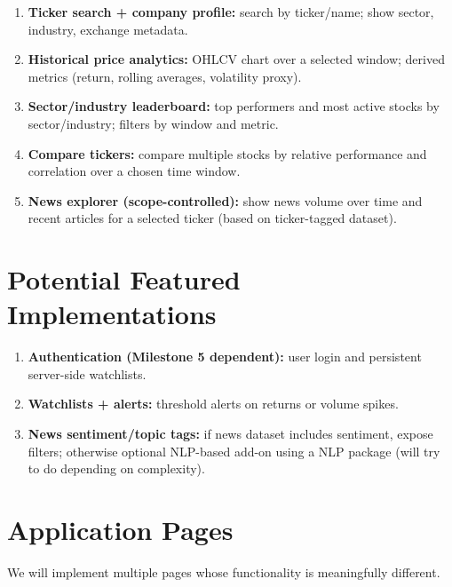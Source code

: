 \documentclass[11pt]{article}
\begin{document}
\begin{enumerate}[label=\textbf{\arabic*.}]
    \item \textbf{Ticker search + company profile:} search by ticker/name; show sector, industry, exchange metadata.
    \item \textbf{Historical price analytics:} OHLCV chart over a selected window; derived metrics (return, rolling averages, volatility proxy).
    \item \textbf{Sector/industry leaderboard:} top performers and most active stocks by sector/industry; filters by window and metric.
    \item \textbf{Compare tickers:} compare multiple stocks by relative performance and correlation over a chosen time window.
    \item \textbf{News explorer (scope-controlled):} show news volume over time and recent articles for a selected ticker (based on ticker-tagged dataset).
\end{enumerate}

\section{Potential Featured Implementations}

\begin{enumerate}[label=\textbf{\arabic*.},start=6]
    \item \textbf{Authentication (Milestone 5 dependent):} user login and persistent server-side watchlists.
    \item \textbf{Watchlists + alerts:} threshold alerts on returns or volume spikes.
    \item \textbf{News sentiment/topic tags:} if news dataset includes sentiment, expose filters; otherwise optional NLP-based add-on using a NLP package (will try to do depending on complexity).
\end{enumerate}

\section{Application Pages}

We will implement multiple pages whose functionality is meaningfully different.
\end{document}
